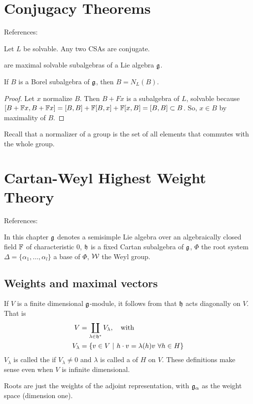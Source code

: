\chapter{Conjugacy Theorems}
\label{cha:conjugacy_theorems}

References: \cite[$\S 16$]{humphreys1972introduction}

\begin{theorem}
    Let $L$ be solvable. Any two CSAs are conjugate.
\end{theorem}

 are maximal solvable subalgebras of a Lie algebra $\mathfrak{g}$.
\begin{lemma}
    If $B$  is a Borel subalgebra of $\mathfrak{g}$, then $B=N_L(B)$.
\end{lemma}
\begin{proof}
    Let $x$ normalize $B$. Then $B + Fx$ is a subalgebra of $L$, solvable because $[B + \mathbb{F} x, B + \mathbb{F} x] = [B,B] + \mathbb{F} [B,x] + \mathbb{F} [x,B] = [B,B] \subset B$. So, $x\in B$ by maximality of $B$.
\end{proof}
\begin{insight}
    Recall that a normalizer of a group is the set of all elements that commutes with the whole group.
\end{insight}


\chapter{Cartan-Weyl Highest Weight Theory}
\label{cha:cartan_weyl_highest_weight_theory}
References: \cite[$\S 20$]{humphreys1972introduction}

In this chapter $\mathfrak{g}$ denotes a semisimple Lie algebra over an algebraically closed field $\mathbb{F}$ of characteristic $0$, $\mathfrak{h}$ is a fixed Cartan subalgebra of $\mathfrak{g}$, $\Phi$ the root system $\Delta = \{\alpha_1,\dotsc,\alpha_l\}$ a base of $\Phi$, $\mathcal{W}$ the Weyl group.

\section{Weights and maximal vectors}
\label{sec:weights_and_maximal_vectors}

If $V$ is a finite dimensional $\mathfrak{g}$-module, it follows from   that $\mathfrak{h}$ acts diagonally on $V$. That is 
\begin{align}
    V &= \coprod_{\lambda\in \mathfrak{h}^* } V_\lambda, \quad \text{with}\\
    V_\lambda &= \{v\in V\ |\ h\cdot v = \lambda(h) v \ \forall h\in H\}
\end{align}
$V_\lambda$ is called the  if $V_\lambda\neq 0$ and $\lambda$ is called a  of $H$ on $V$. 
These definitions make sense even when $V$ is infinite dimensional.
\begin{insight}
    Roots are just the weights of the adjoint representation, with $\mathfrak{g}_\alpha$  as the weight space (dimension one).
\end{insight}

